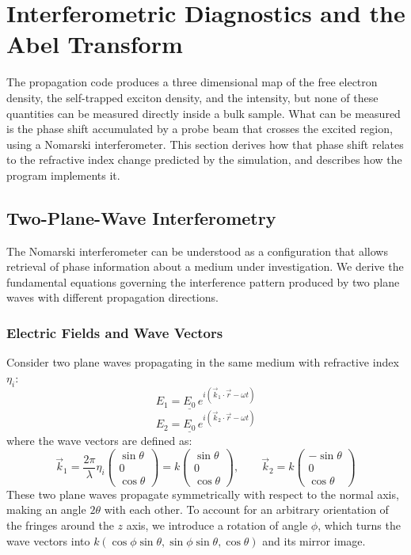 \section{Interferometric Diagnostics and the Abel Transform}

The propagation code produces a three dimensional map of the free electron density, the self-trapped exciton density, and the intensity, but none of these quantities can be measured directly inside a bulk sample. What can be measured is the phase shift accumulated by a probe beam that crosses the excited region, using a Nomarski interferometer. This section derives how that phase shift relates to the refractive index change predicted by the simulation, and describes how the program implements it.

\subsection{Two-Plane-Wave Interferometry}

The Nomarski interferometer can be understood as a configuration that allows retrieval of phase information about a medium under investigation. We derive the fundamental equations governing the interference pattern produced by two plane waves with different propagation directions.

\subsubsection{Electric Fields and Wave Vectors}

Consider two plane waves propagating in the same medium with refractive index $\eta_i$:
\begin{equation}
E_1 = \underline{E_0} \, e^{i(\vec{k}_1 \cdot \vec{r} - \omega t)}
\end{equation}
\begin{equation}
E_2 = \underline{E_0} \, e^{i(\vec{k}_2 \cdot \vec{r} - \omega t)}
\end{equation}
where the wave vectors are defined as:
\begin{equation}
\vec{k}_1 = \frac{2\pi}{\lambda}\eta_i \begin{pmatrix}\sin{\theta}\\0\\\cos{\theta}\end{pmatrix} = k \begin{pmatrix}\sin{\theta}\\0\\\cos{\theta}\end{pmatrix}, \qquad
\vec{k}_2 = k \begin{pmatrix}-\sin{\theta}\\0\\\cos{\theta}\end{pmatrix}
\end{equation}
These two plane waves propagate symmetrically with respect to the normal axis, making an angle $2\theta$ with each other. To account for an arbitrary orientation of the fringes around the $z$ axis, we introduce a rotation of angle $\phi$, which turns the wave vectors into $k(\cos\phi\sin\theta,\sin\phi\sin\theta,\cos\theta)$ and its mirror image.

